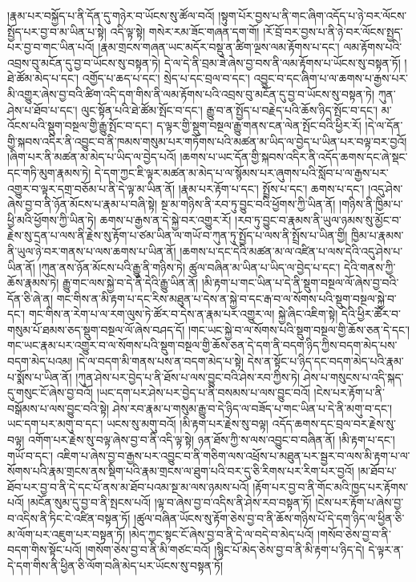 །རྣམ་པར་བསྐྱོད་པ་ནི་དོན་དུ་གཉེར་བ་ཡོངས་སུ་ཚོལ་བའོ། །སྟུག་པོར་བྱས་པ་ནི་གང་ཞིག་འདོད་པ་ཉེ་བར་ལོངས་སྤྱོད་པར་བྱ་བ་མ་ཡིན་པ་སྟེ། འདི་ལྟ་སྟེ། གསེར་རམ་ཟོང་གཞན་དག་གོ། །རོ་བྲོ་བར་བྱས་པ་ནི་ཉེ་བར་ལོངས་སྤྱད་པར་བྱ་བ་གང་ཡིན་པའོ། །རྣམ་གྲངས་གཞན་ཡང་མདོར་བསྡུ་ན་ཚིག་ལྔས་ལམ་རྟོགས་པ་དང་། ལམ་རྟོགས་པའི་འབྲས་བུ་མངོན་དུ་བྱ་བ་ཡོངས་སུ་བསྟན་ཏེ། དེ་ལ་དེ་ནི་བྲམ་ཟེ་ཞེས་བྱ་བས་ནི་ལམ་རྟོགས་པ་ཡོངས་སུ་བསྟན་ཏོ། །
ཐེ་ཚོམ་མེད་པ་དང་། འགྱོད་པ་ཆད་པ་དང་། སྲེད་པ་དང་བྲལ་བ་དང་། འབྱུང་བ་དང་ཞིག་པ་ལ་ཆགས་པ་རྒྱས་པར་མི་འགྱུར་ཞེས་བྱ་བའི་ཚིག་འདི་དག་གིས་ནི་ལམ་རྟོགས་པའི་འབྲས་བུ་མངོན་དུ་བྱ་བ་ཡོངས་སུ་བསྟན་ཏེ། ཀུན་ཤེས་པ་ཐོབ་པ་དང་། ལུང་སྟོན་པའི་ཐེ་ཚོམ་སྤོང་བ་དང་། རྒྱུ་བ་ན་སྤྱོད་པ་བརྗེད་པའི་ཆོས་ཉིད་སྤོང་བ་དང་། མ་འོངས་པའི་སྡུག་བསྔལ་གྱི་རྒྱུ་སྤོང་བ་དང་། ད་ལྟར་གྱི་སྡུག་བསྔལ་རྒྱུ་གནས་ངན་ལེན་སྤོང་བའི་ཕྱིར་རོ། །དེ་ལ་དོན་གྱི་སྐབས་འདིར་ནི་འབྱུང་བ་ནི་ཁམས་གསུམ་པར་གཏོགས་པའི་མཚན་མ་ཡིད་ལ་བྱེད་པ་ཡིན་པར་བལྟ་བར་བྱའོ། །ཞིག་པར་ནི་མཚན་མ་མེད་པ་ཡིད་ལ་བྱེད་པའོ། །ཆགས་པ་ཡང་དོན་གྱི་སྐབས་འདིར་ནི་འདོད་ཆགས་དང་ཞེ་སྡང་དང་གཏི་མུག་རྣམས་ཏེ། དེ་དག་ཀྱང་ཇི་ལྟར་མཚན་མ་མེད་པ་ལ་སྙོམས་པར་ཞུགས་པའི་སློབ་པ་ལ་རྒྱས་པར་འགྱུར་བ་ལྟར་དགྲ་བཅོམ་པ་ནི་དེ་ལྟ་མ་ཡིན་ནོ། །རྣམ་པར་རྟོག་པ་དང་། སྤྲོས་པ་དང་། ཆགས་པ་དང་། །འདུ་ཤེས་ཞེས་བྱ་བ་ནི་ཉོན་མོངས་པ་རྣམ་པ་བཞི་སྟེ། སྔ་མ་གཉིས་ནི་རབ་ཏུ་བྱུང་བའི་ཕྱོགས་ཀྱི་ཡིན་ནོ། །གཉིས་ནི་ཁྱིམ་པ་ཕྱི་མའི་ཕྱོགས་ཀྱི་ཡིན་ཏེ། ཆགས་པ་རྒྱས་ན་དེ་སྐྱེ་བར་འགྱུར་རོ། །རབ་ཏུ་བྱུང་བ་རྣམས་ནི་ཡུལ་ཉམས་སུ་མྱོང་བ་རྗེས་སུ་དྲན་པ་ལས་ནི་རྗེས་སུ་རྟོག་པ་ཙམ་ཡིན་ལ་གཡོ་བ་ཀུན་ཏུ་སྤྱོད་པ་ལས་ནི་སྤྲོས་པ་ཡིན་གྱི། ཁྱིམ་པ་རྣམས་ནི་ཡུལ་ཉེ་བར་གནས་པ་ལས་ཆགས་པ་ཡིན་ནོ། །ཆགས་པ་དང་དེའི་མཚན་མ་ལ་འཛིན་པ་ལས་དེའི་འདུ་ཤེས་པ་ཡིན་ནོ། །ཀུན་ནས་ཉོན་མོངས་པའི་རྒྱུ་ནི་གཉིས་ཏེ། ཚུལ་བཞིན་མ་ཡིན་པ་ཡིད་ལ་བྱེད་པ་དང་། དེའི་གནས་ཀྱི་ཆོས་རྣམས་ཏེ། རྒྱུ་གང་ལས་སྐྱེ་བ་དེ་ནི་དེའི་རྒྱུ་ཡིན་ནོ། །མི་རྟག་པ་གང་ཡིན་པ་དེ་ནི་སྡུག་བསྔལ་ལོ་ཞེས་བྱ་བའི་དོན་ཅི་ཞེ་ན། གང་གིས་ན་མི་རྟག་པ་དང་རིས་མཐུན་པ་དེས་ན་སྐྱེ་བ་དང་རྒ་བ་ལ་སོགས་པའི་སྡུག་བསྔལ་སྐྱེ་བ་དང་། གང་གིས་ན་རེག་པ་ལ་རག་ལུས་ཏེ་ཚོར་བ་དེས་ན་རྣམ་པར་འགྱུར་ལ། སྐྱེ་ཞིང་འཇིག་སྟེ། དེའི་ཕྱིར་ཚོར་བ་གསུམ་པོ་ཐམས་ཅད་སྡུག་བསྔལ་ལོ་ཞེས་བཤད་དོ། །གང་ཡང་སྐྱེ་བ་ལ་སོགས་པའི་སྡུག་བསྔལ་གྱི་ཆོས་ཅན་དེ་དང་། གང་ཡང་རྣམ་པར་འགྱུར་བ་ལ་སོགས་པའི་སྡུག་བསྔལ་གྱི་ཆོས་ཅན་དེ་དག་ནི་བདག་ཉིད་ཀྱིས་བདག་མེད་པས་བདག་མེད་པའམ། །དེ་ལ་བདག་མི་གནས་པས་ན་བདག་མེད་པ་སྟེ། དེས་ན་སྟོང་པ་ཉིད་དང་བདག་མེད་པའི་རྣམ་པ་སྨོས་པ་ཡིན་ནོ། །ཀུན་ཤེས་པར་བྱེད་པ་ནི་ཐོས་པ་ལས་བྱུང་བའི་ཤེས་རབ་ཀྱིས་ཏེ། ཤེས་པ་གསུངས་པ་འདི་སྐད་དུ་གསུང་ངོ་ཞེས་བྱ་བའོ། །ཡང་དག་པར་ཤེས་པར་བྱེད་པ་ནི་བསམས་པ་ལས་བྱུང་བའོ། །ངེས་པར་རྟོག་པ་ནི་བསྒོམས་པ་ལས་བྱུང་བའི་སྟེ། ཤེས་རབ་རྣམ་པ་གསུམ་རྒྱུ་བ་དེ་ཉིད་ལ་བཟོད་པ་གང་ཡིན་པ་དེ་ནི་མགུ་བ་དང་། ཡང་དག་པར་མགུ་བ་དང་། ཡངས་སུ་མགུ་བའོ། །མི་རྟག་པར་རྗེས་སུ་བལྟ། འདོད་ཆགས་དང་བྲལ་བར་རྗེས་སུ་བལྟ། འགོག་པར་རྗེས་སུ་བལྟ་ཞེས་བྱ་བ་ནི་འདི་ལྟ་སྟེ། ཉན་ཐོས་ཀྱི་ས་ལས་འབྱུང་བ་བཞིན་ནོ། །མི་རྟག་པ་དང་། གཡོ་བ་དང་། འཇིག་པ་ཞེས་བྱ་བ་རྒྱས་པར་འབྱུང་བ་ནི་གཅིག་ལས་འཕྲོས་པ་མཐུན་པར་སྦྱར་བ་ལས་མི་རྟག་པ་ལ་སོགས་པའི་རྣམ་གྲངས་ནས་སྡིག་པའི་རྣམ་གྲངས་ལ་ཐུག་པའི་བར་དུ་ཅི་རིགས་པར་རིག་པར་བྱའོ། །མ་ཐོབ་པ་ཐོབ་པར་བྱ་བ་ནི་དེ་དང་པོ་ནས་མ་ཐོབ་པའམ་སྔ་མ་ལས་ཉམས་པའོ། །རྟོག་པར་བྱ་བ་ནི་གོང་མའི་ཁྱད་པར་རྟོགས་པའོ། །མངོན་སུམ་དུ་བྱ་བ་ནི་སྤངས་པའོ། །ལྟ་བ་ཞེས་བྱ་བ་འདིས་ནི་ཤེས་རབ་བསྟན་ཏོ། །ངེས་པར་རྟོག་པ་ཞེས་བྱ་བ་འདིས་ནི་ཏིང་ངེ་འཛིན་བསྟན་ཏོ། །ཚུལ་བཞིན་ཡོངས་སུ་རྟོག་ཅེས་བྱ་བ་ནི་ཆོས་གཉིས་པོ་དེ་དག་ཉིད་ལ་ཕྱིན་ཅི་མ་ལོག་པར་འཇུག་པར་བསྟན་ཏོ། །མེད་ཀྱང་སྟང་ངོ་ཞེས་བྱ་བ་ནི་དེ་ལ་བདེ་བ་མེད་པའོ། །གསོབ་ཅེས་བྱ་བ་ནི་བདག་གིས་སྟོང་པའོ། །གསོག་ཅེས་བྱ་བ་ནི་མི་གཙང་བའོ། །སྙིང་པོ་མེད་ཅེས་བྱ་བ་ནི་མི་རྟག་པ་ཉིད་དེ། དེ་ལྟར་ན་དེ་དག་གིས་ནི་ཕྱིན་ཅི་ལོག་བཞི་མེད་པར་ཡོངས་སུ་བསྟན་ཏོ། 